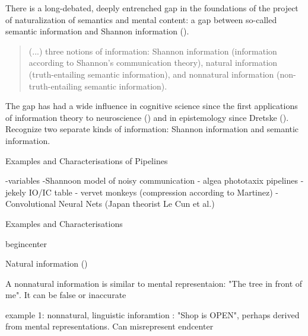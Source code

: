 \documentclass[10pt, aspectratio=169, handout]{beamer}
\begin{document}
\begin{frame}[label=gap_intro]
    There is a long-debated, deeply entrenched gap in the foundations of the project of naturalization of semantics and mental content: a gap between so-called semantic information and Shannon information (\cite{godfrey-smith_biological_2016,piccinini_information_2011}).

     \begin{quote}
        (...) three notions of information: Shannon information (information according to Shannon’s  communication theory), natural information (truth-entailing semantic information), and  nonnatural information (non-truth-entailing semantic information). \cite{piccinini_information_2011}
    \end{quote}

    \medskip 
    
      
    The gap has had a wide influence in cognitive science since the first applications of information theory to neuroscience (\cite{mackay_limiting_1952}) and in epistemology since Dretske (\cite{dretske_knowledge_1981}). Recognize two separate kinds of information: Shannon information and semantic information. 

   
   

  

\end{frame}




    \begin{frame}{Examples and Characterisations of Pipelines }

        -variables
        -Shannoon model of noisy communication 
        - algea phototaxix pipelines
        - jekely IO/IC table
        - vervet monkeys (compression according to Martinez)
        - Convolutional Neural Nets (Japan theorist Le Cun et al.)


    \end{frame}
    



\begin{frame}[label=examples]{Examples and Characterisations}

  begin{center}

  

Natural information ()

A nonnatural information is similar to mental representaion: "The tree in front of me". It can be false or inaccurate


    example 1: nonnatural, linguistic inforamtion : "Shop is OPEN", perhaps derived from mental representations. Can misrepresent 
 end{center}



\end{frame}
\end{document}
